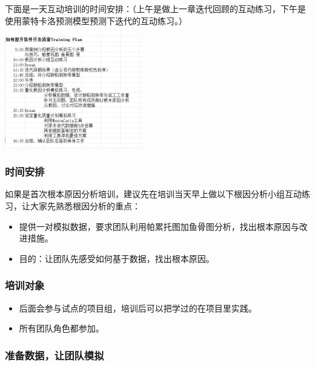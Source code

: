 下面是一天互动培训的时间安排：（上午是做上一章迭代回顾的互动练习，下午是使用蒙特卡洛预测模型预测下迭代的互动练习。）


\includegraphics[width=6cm]{微信截图_20230830093612.png}

\hypertarget{ux65f6ux95f4ux5b89ux6392}{%
\subsubsection{时间安排}\label{ux65f6ux95f4ux5b89ux6392}}

如果是首次根本原因分析培训，建议先在培训当天早上做以下根因分析小组互动练习，让大家先熟悉根因分析的重点：

\begin{itemize}
\tightlist
\item
  提供一对模拟数据，要求团队利用帕累托图加鱼骨图分析，找出根本原因与改进措施。
\item
  目的：让团队先感受如何基于数据，找出根本原因。
\end{itemize}

\hypertarget{ux57f9ux8badux5bf9ux8c61}{%
\subsubsection{培训对象}\label{ux57f9ux8badux5bf9ux8c61}}

\begin{itemize}
\tightlist
\item
  后面会参与试点的项目组，培训后可以把学过的在项目里实践。
\item
  所有团队角色都参加。
\end{itemize}

\hypertarget{ux51c6ux5907ux6570ux636eux8ba9ux56e2ux961fux6a21ux62df}{%
\subsubsection{准备数据，让团队模拟}\label{ux51c6ux5907ux6570ux636eux8ba9ux56e2ux961fux6a21ux62df}}

